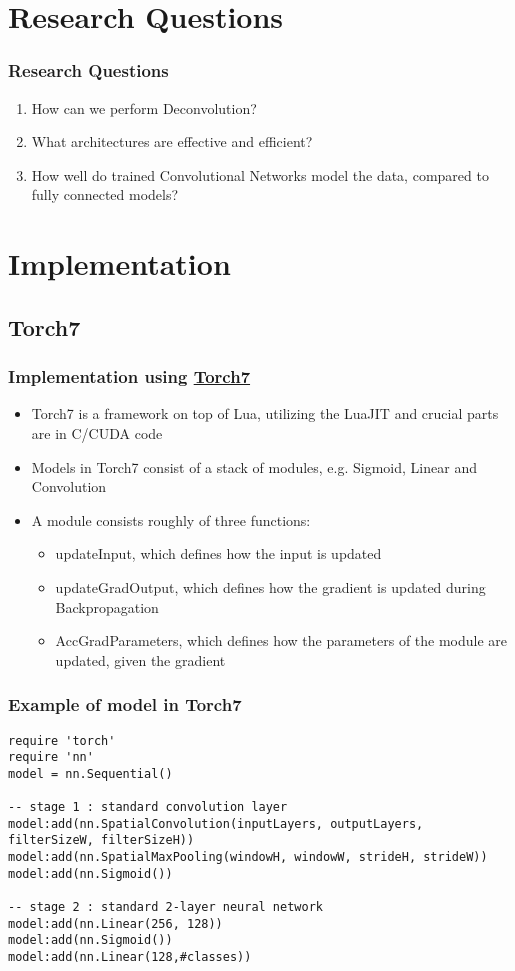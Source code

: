 \documentclass{beamer}
\begin{document}
\section{Research Questions}
\begin{frame}
\frametitle{Research Questions}
\begin{enumerate}
	\item How can we perform Deconvolution?
	\item What architectures are effective and efficient?
	\item How well do trained Convolutional Networks model the data, compared to fully connected models?
\end{enumerate}
\end{frame}

\section{Implementation}

\subsection{Torch7}
\begin{frame}
\frametitle{Implementation using \href{http://torch.ch/}{Torch7}}
\begin{itemize}
	\item Torch7 is a framework on top of Lua, utilizing the LuaJIT and crucial parts are in C/CUDA code
	\item Models in Torch7 consist of a stack of modules, e.g. Sigmoid, Linear and Convolution
	\item A module consists roughly of three functions:
		\begin{itemize}
			\item updateInput, which defines how the input is updated
			\item updateGradOutput, which defines how the gradient is updated during Backpropagation
			\item AccGradParameters, which defines how the parameters of the module are updated, given the gradient
		\end{itemize}
\end{itemize}
\end{frame}

\begin{frame}[fragile]
\frametitle{Example of model in Torch7}
\begin{lstlisting}
require 'torch'
require 'nn'
model = nn.Sequential()

-- stage 1 : standard convolution layer
model:add(nn.SpatialConvolution(inputLayers, outputLayers, filterSizeW, filterSizeH))
model:add(nn.SpatialMaxPooling(windowH, windowW, strideH, strideW))
model:add(nn.Sigmoid())

-- stage 2 : standard 2-layer neural network
model:add(nn.Linear(256, 128))
model:add(nn.Sigmoid())
model:add(nn.Linear(128,#classes))
\end{lstlisting}
\end{frame}
\end{document}

